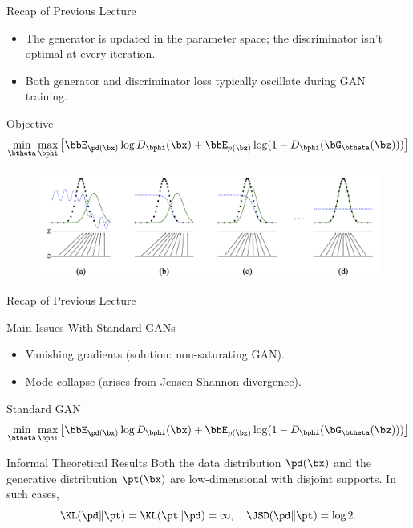 \documentclass{beamer}
\begin{document}
\begin{frame}{Recap of Previous Lecture}
	\begin{itemize}
		\item The generator is updated in the parameter space; the discriminator isn't optimal at every iteration.
		\item Both generator and discriminator loss typically oscillate during GAN training.
	\end{itemize}
	\begin{block}{Objective}
		\vspace{-0.5cm}
		\[
		\min_{\btheta} \max_{\bphi} \left[ \bbE_{\pd(\bx)} \log D_{\bphi}(\bx) + \bbE_{p(\bz)} \log (1 - D_{\bphi}(\bG_{\btheta}(\bz))) \right]
		\]
		\vspace{-0.5cm}
	\end{block}
	\begin{figure}
		\centering
		\includegraphics[width=1.0\linewidth]{figs/gan_1}
	\end{figure}
\end{frame}
\begin{frame}{Recap of Previous Lecture}
	\begin{block}{Main Issues With Standard GANs}
		\begin{itemize}
			\item Vanishing gradients (solution: non-saturating GAN).
			\item Mode collapse (arises from Jensen-Shannon divergence).
		\end{itemize}
	\end{block}
	\begin{block}{Standard GAN}
		\vspace{-0.2cm}
		\[
		\min_{\btheta} \max_{\bphi} \left[ \bbE_{\pd(\bx)} \log D_{\bphi}(\bx) + \bbE_{p(\bz)} \log (1 - D_{\bphi}(\bG_{\btheta}(\bz))) \right]
		\]
		\vspace{-0.4cm}
	\end{block}
	\vspace{-0.1cm}
	\begin{block}{Informal Theoretical Results}
		Both the data distribution $\pd(\bx)$ and the generative distribution $\pt(\bx)$ are low-dimensional with disjoint supports. In such cases,
		\[
			\KL(\pd \| \pt) = \KL(\pt \| \pd) = \infty, \quad \JSD(\pd \| \pt) = \log 2.
		\]
	\end{block}
\end{frame}
\end{document}
